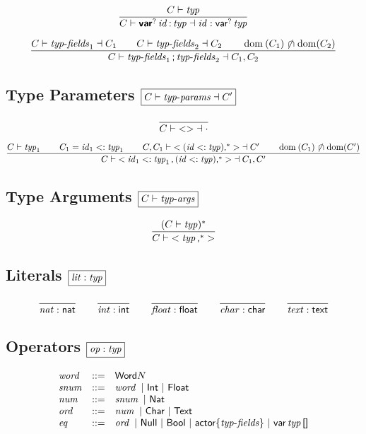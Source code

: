 $$
\frac{
  C \vdash \operatorname{\mathit{typ}}
}{
  C \vdash \textsf{\sf\textbf{var}}^? \operatorname{\mathit{id}} \textsf{\sf:} \operatorname{\mathit{typ}} \dashv \operatorname{\mathit{id}} : \textsf{\sf var}^? \operatorname{\mathit{typ}}
}
$$

$$
\frac{
  C \vdash \x{typ-fields}_1 \dashv C_1
  \qquad
  C \vdash \x{typ-fields}_2 \dashv C_2
  \qquad
  \Dom(C_1) \setdisj \Dom(C_2)
}{
  C \vdash \x{typ-fields}_1 \K; \x{typ-fields}_2 \dashv C_1, C_2
}
$$


\subsection*{Type Parameters \hfill $\boxed{C \vdash \operatorname{\mathit{typ-params}} \dashv C'}$}

$$
\frac{
}{
  C \vdash {\Klt \Kgt} \dashv \cdot
}
$$

$$
\frac{
  C \vdash \x{typ}_1
  \qquad
  C_1 = \x{id}_1 <: \x{typ}_1
  \qquad
  C, C_1 \vdash {\Klt (\x{id} \Ksub \x{typ})\K,^\ast \Kgt} \dashv C'
  \qquad
  \Dom(C_1) \setdisj \Dom(C')
}{
  C \vdash {\Klt \x{id}_1 \Ksub \x{typ}_1\K, \, (\x{id} \Ksub \x{typ})\K,^\ast \Kgt} \dashv C_1, C'
}
$$


\subsection*{Type Arguments \hfill $\boxed{C \vdash \operatorname{\mathit{typ-args}}}$}

$$
\frac{
  (C \vdash \x{typ})^\ast
}{
  C \vdash {\Klt \x{typ}\K,^\ast \Kgt}
}
$$


\subsection*{Literals \hfill $\boxed{\operatorname{\mathit{lit}} : \operatorname{\mathit{typ}}}$}

$$
\frac{
}{
  \operatorname{\mathit{nat}} : \textsf{\sf nat}
}
\qquad
\frac{
}{
  \operatorname{\mathit{int}} : \textsf{\sf int}
}
\qquad
\frac{
}{
  \operatorname{\mathit{float}} : \textsf{\sf float}
}
\qquad
\frac{
}{
  \operatorname{\mathit{char}} : \textsf{\sf char}
}
\qquad
\frac{
}{
  \operatorname{\mathit{text}} : \textsf{\sf text}
}
$$


\subsection*{Operators \hfill $\boxed{\operatorname{\mathit{op}} : \operatorname{\mathit{typ}}}$}

$$
\begin{array}{@{}lcl@{}}
\x{word} &::=& \K{Word}N \\
\x{snum} &::=& \x{word} ~|~ \K{Int} ~|~ \K{Float} \\
\x{num} &::=& \x{snum} ~|~ \K{Nat} \\
\x{ord} &::=& \x{num} ~|~ \K{Char} ~|~ \K{Text} \\
\x{eq} &::=& \x{ord} ~|~ \K{Null} ~|~ \K{Bool} ~|~ \K{actor} \{\x{typ-fields}\} ~|~ \K{var} \x{typ}\K{[]} \\
\end{array}
$$


